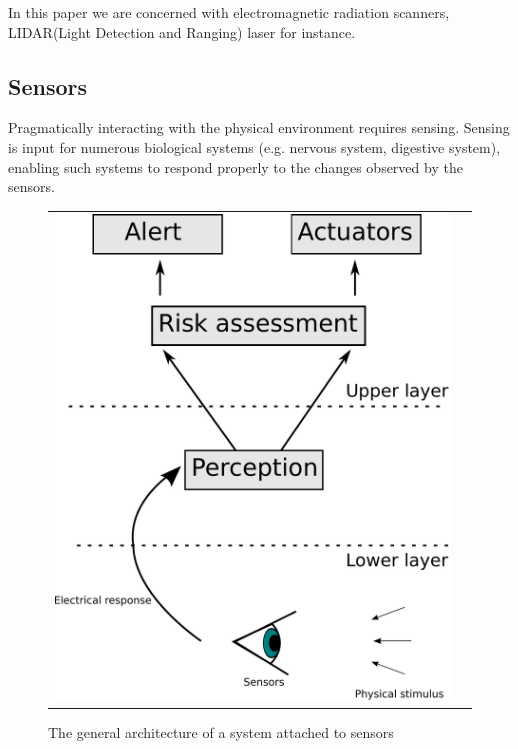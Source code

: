
In this paper we are concerned with electromagnetic radiation scanners, LIDAR(Light Detection and Ranging) laser for instance.

\subsection{Sensors}


Pragmatically interacting with the physical environment requires sensing. Sensing is input for numerous biological systems (e.g. nervous system, digestive system), enabling such systems to respond properly to the changes observed by the sensors. 

\begin{figure}[h]
   \centering
     \begin{tabular}{lr}
       \includegraphics[scale=0.45]{img/fig:sensors:role}
     \end{tabular}
   \caption{The general architecture of a system attached to sensors}
   \label{fig:sensors:role}
 \end{figure}

